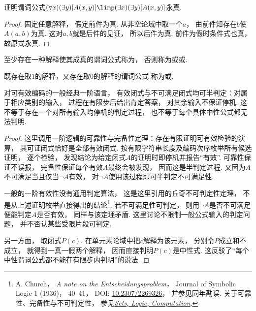 \begin{example}
证明谓词公式\(
	(\forall x)
	(\exists y)
	[A(x,y)]
	\limp
	(\exists x)
	(\exists y)
	[A(x,y)]
\)永真.
    \begin{proof}
        固定任意解释，
        假定前件为真.
        从非空论域中取一个\(a\)，
        由前件知存在\(b\)使\(A(a,b)\)为真.
        这对\(a,b\)就是后件的见证，
        所以后件为真.
        前件为假时条件式也真，
        故原式永真.
    \end{proof}
\end{example}

至少存在一种解释使其成真的谓词公式称为，
否则称为或或.

既存在取\(1\)的解释，又存在取\(0\)的解释的谓词公式
称为或.

\begin{theorem}[半判定与判定的区别]
    对可有效编码的一般经典一阶语言，
    有效闭式与不可满足闭式均可半判定：对属于相应类别的输入，
    过程在有限步后给出肯定答案，
    对其余输入不保证停机.
    这不等于存在一个对所有输入均停机的判定过程，
    也不等于每个具体中性公式都无法判明.
    \begin{proof}
        这里调用一阶逻辑的可靠性与完备性定理：存在有限证明可有效检验的演算，
        其可证闭式恰好是全部有效闭式.
        按有限字符串长度及编码次序枚举所有候选证明，
        逐个检验，
        发现结论为给定闭式\(A\)的证明时即停机并报告“有效”.
        可靠性保证不误报，
        完备性保证每个有效\(A\)最终会被发现，
        因而这是半判定过程.
        又因为\(A\)不可满足当且仅当\(\neg A\)有效，
        对\(\neg A\)使用该过程即可半判定不可满足性.

        一般的一阶有效性没有通用判定算法，
        这是这里引用的丘奇不可判定性定理，
        不是从上述证明枚举直接得出的结论\footnote{
        A. Church，
        \emph{A note on the Entscheidungsproblem}，
        Journal of Symbolic Logic 1 (1936)，
        40--41，
        DOI: \href{https://doi.org/10.2307/2269326}{10.2307/2269326}，
        并参见同年勘误.
        关于可靠性、完备性与不可判定性，
        参见\href{https://slc.openlogicproject.org/}{\emph{Sets, Logic, Computation}}.
        }.
        若不可满足性可判定，
        则用\(\neg A\)是否不可满足便能判定\(A\)是否有效，
        同样与该定理矛盾.
        这里讨论不限制一般公式输入的判定问题，
        并不否认某些受限片段可判定.

        另一方面，
        取闭式\(P(c)\).
        在单元素论域中把\(c\)解释为该元素，
        分别令\(P\)成立和不成立，
        就得到一真一假两个解释，
        因而直接判明\(P(c)\)是中性式.
        这反驳了“每个中性谓词公式都不能在有限步内判明”的说法.
    \end{proof}
\end{theorem}

